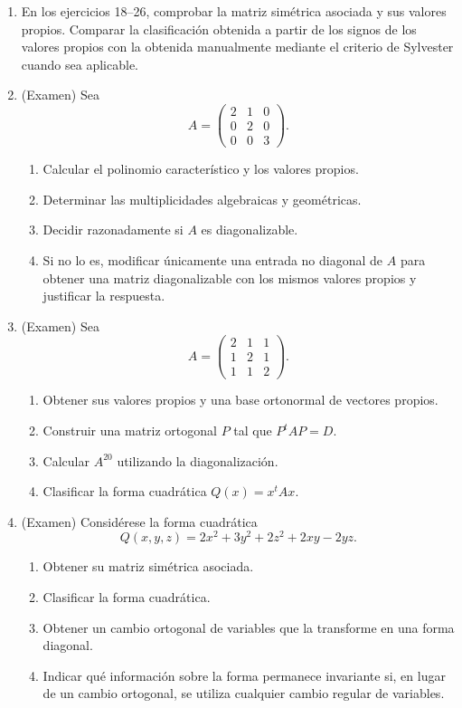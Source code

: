 \begin{enumerate}
\item \M En los ejercicios 18--26, comprobar la matriz simétrica asociada y sus valores propios. Comparar la clasificación obtenida a partir de los signos de los valores propios con la obtenida manualmente mediante el criterio de Sylvester cuando sea aplicable.

\item (Examen) Sea
\[
A=\begin{pmatrix}
2&1&0\\
0&2&0\\
0&0&3
\end{pmatrix}.
\]
\begin{enumerate}[label=\alph*)]
\item Calcular el polinomio característico y los valores propios.
\item Determinar las multiplicidades algebraicas y geométricas.
\item Decidir razonadamente si $A$ es diagonalizable.
\item Si no lo es, modificar únicamente una entrada no diagonal de $A$ para obtener una matriz diagonalizable con los mismos valores propios y justificar la respuesta.
\end{enumerate}

\item (Examen) Sea
\[
A=\begin{pmatrix}
2&1&1\\
1&2&1\\
1&1&2
\end{pmatrix}.
\]
\begin{enumerate}[label=\alph*)]
\item Obtener sus valores propios y una base ortonormal de vectores propios.
\item Construir una matriz ortogonal $P$ tal que $P^tAP=D$.
\item Calcular $A^{20}$ utilizando la diagonalización.
\item Clasificar la forma cuadrática $Q(x)=x^tAx$.
\end{enumerate}

\item (Examen) Considérese la forma cuadrática
\[
Q(x,y,z)=2x^2+3y^2+2z^2+2xy-2yz.
\]
\begin{enumerate}[label=\alph*)]
\item Obtener su matriz simétrica asociada.
\item Clasificar la forma cuadrática.
\item Obtener un cambio ortogonal de variables que la transforme en una forma diagonal.
\item Indicar qué información sobre la forma permanece invariante si, en lugar de un cambio ortogonal, se utiliza cualquier cambio regular de variables.
\end{enumerate}

\end{enumerate}
